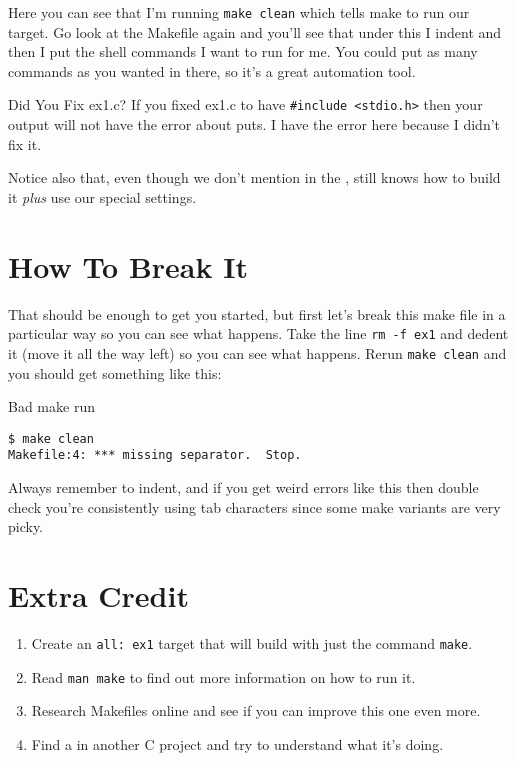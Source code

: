 Here you can see that I'm running \verb|make clean| which tells
make to run our  target.  Go look at the Makefile
again and you'll see that under this I indent and then I put
the shell commands I want  to run for me.  You could
put as many commands as you wanted in there, so it's a great
automation tool.

\begin{aside}{Did You Fix ex1.c?}
If you fixed ex1.c to have \verb|#include <stdio.h>| then your
output will not have the error about puts.  I have the error
here because I didn't fix it.
\end{aside}

Notice also that, even though we don't mention  in the
,  still knows how to build it \emph{plus}
use our special settings.


\section{How To Break It}

That should be enough to get you started, but first let's break this 
make file in a particular way so you can see what happens.  Take
the line \verb|rm -f ex1| and dedent it (move it all the way left)
so you can see what happens.  Rerun \verb|make clean| and you should
get something like this:

\begin{Terminal}{Bad make run}
\begin{lstlisting}
$ make clean
Makefile:4: *** missing separator.  Stop.
\end{lstlisting}
\end{Terminal}

Always remember to indent, and if you get weird errors like this
then double check you're consistently using tab characters since
some make variants are very picky.

\section{Extra Credit}

\begin{enumerate}
\item Create an \verb|all: ex1| target that will build  with
    just the command \verb|make|.
\item Read \verb|man make| to find out more information on how to run it.
\item Research Makefiles online and see if you can improve this one even more.
\item Find a  in another C project and try to understand
    what it's doing.
\end{enumerate}

